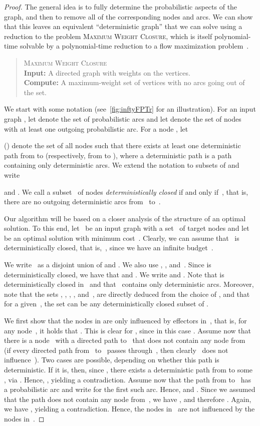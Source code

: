 \documentclass{article}
\newcommand{\probSharpDef}[3]{
  \begin{quote}
    #1 \\
    \textbf{Input:} #2 \\
    \textbf{Compute:} #3
  \end{quote}
}
\newcommand{\probClosure}{\textsc{Maximum Weight Closure}\xspace}
\begin{document}
\begin{proof}
  The general idea is to fully determine the probabilistic aspects of the graph,
  and then to remove all of the corresponding nodes and arcs.
  We can show that this leaves an equivalent ``deterministic graph'' that we can solve using a reduction to 
  the problem \probClosure,
  which is itself polynomial-time solvable by a polynomial-time reduction to a flow maximization problem~\cite[Chapter~19]{AMO93}.
  \probSharpDef
    {\probClosure}
    {A directed graph  with weights on the vertices.}
    {A maximum-weight set of vertices   with no arcs going out of the set.}    
  We start with some notation (see~\autoref{fig:inftyFPTr} for an illustration).
  For an input graph ,
  let  denote the set of
  probabilistic arcs
  and let  denote the set of
  nodes with at least one outgoing probabilistic arc.
  For a node , let
  
  ()
  denote the set of all nodes  such that there exists at least
  one deterministic path
  from  to 
  (respectively, from  to ),
  where a deterministic path is a path containing only deterministic arcs.
  We extend the notation to subsets  of  and write
  
  and
  .
  We call a subset~ of nodes
  \emph{deterministically closed} if and only if~,
  that is, there are no outgoing deterministic arcs from~ to~.
  
  Our algorithm will be based on a closer analysis of
  the structure of an optimal solution.
  To this end, let~ be an input graph with a
  set~ of target nodes and let~ be an
  optimal solution with minimum cost~.
  Clearly, we can assume that~ is deterministically closed, that
  is,~, since we have an infinite budget~.
         
        We write~ as a disjoint union of  and .
	We also use , , and~.
	Since  is deterministically closed, we have that  and .
	We write  and . 
	Note that  is deterministically closed in~ and that~ contains only deterministic arcs.
	Moreover, note that the sets , , , , and~, are directly deduced from the choice of ,
	and that for a given~, the set  can be any deterministically
        closed subset of .
  
  We first show that the nodes in  are only influenced by effectors in~, that is, for any node~, it holds that
  . This is clear for , since in this case .
  Assume now that there is a node~ with a directed path to~ 
	that does not contain  any node from~ (if every directed path from~ to~ passes through~, then clearly~ does not influence~). 
	Two cases are possible, depending on whether this path is deterministic.
	If it is, then, since , there exists a deterministic path from  to some , via .
	Hence, , yielding a contradiction.
	Assume now that the path from  to~ has a probabilistic arc and write  for the first such arc. Hence,  and . Since we assumed that the path does not contain any node from~, we have , and therefore . Again, we have , yielding a contradiction. 
        Hence, the nodes in~ are not influenced by the
        nodes in~.
        

\end{proof}
\end{document}
